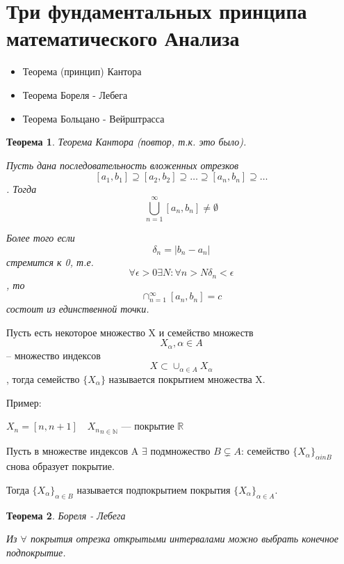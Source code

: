 \documentclass{book}
\newtheorem{Th}{Теорема}[chapter]
\begin{document}
\section{Три фундаментальных принципа математического Анализа}
\begin{itemize}
	\item Теорема (принцип) Кантора
	\item Теорема Бореля - Лебега
	\item Теорема Больцано - Вейрштрасса
\end{itemize}
\begin{Th}
Теорема Кантора (повтор, т.к. это было).

Пусть дана последовательность вложенных отрезков
$$[a_1, b_1] \supseteq [a_2, b_2]\supseteq \ldots \supseteq [a_n, b_n]\supseteq \ldots$$.
Тогда $$\bigcup_{n=1}^{\infty}[a_n, b_n] \neq \emptyset$$

Более того если $$\delta_n = |b_n-a_n|$$ стремится к 0, т.е. $$\forall \epsilon > 0 \exists N : \forall n > N \delta_n<\epsilon$$, то $$\cap_{n=1}^{\infty}[a_n, b_n]={c}$$ состоит из единственной точки.
\end{Th}

Пусть есть некоторое множество X и семейство множеств $$X_{\alpha}, \alpha \in A$$ -- множество индексов
$$X \subset \cup_{\alpha \in A}X_{\alpha}$$, тогда семейство $\{X_{\alpha}\}$ называется покрытием множества X.

Пример:

$X_n = [n, n+1]\quad {X_n}_{n\in \mathds{N}}$ --- покрытие $\mathds{R}$

Пусть в множестве  индексов A $\exists$ подмножество $B\varsubsetneq A$: семейство $\{X_{\alpha}\}_{\alpha in B}$ снова образует покрытие.

Тогда $\{X_{\alpha}\}_{\alpha \in B}$ называется подпокрытием покрытия $\{X_{\alpha}\}_{\alpha \in A}$.

\begin{Th}
	Бореля - Лебега
	
	
	Из $\forall$ покрытия отрезка открытыми интервалами можно выбрать конечное подпокрытие.
	
\end{Th}
\end{document}
